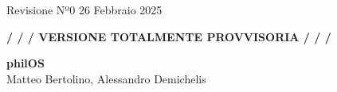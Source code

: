 \documentclass[a4paper,12pt]{article}
\begin{document}
\thispagestyle{empty} %
\footnotesize
Revisione Nº0
\hfill
26 Febbraio 2025
\normalsize 

\begin{center}
\textbf{ / / / VERSIONE TOTALMENTE PROVVISORIA / / /} 
\end{center}

\vspace*{\fill}
\begin{center}
\Large{\textbf{philOS}}
\vspace{0.1cm}
\normalsize
\\ Matteo Bertolino, Alessandro Demichelis \\
\vspace*{\fill}
\vspace{0.5cm}
\medskip
\normalsize
\end{center}

\pagebreak

\renewcommand{\contentsname}{Contenuti}
\tableofcontents
\bigskip

\pagebreak










\renewcommand{\refname}{Riferimenti}
\printbibliography
\bigskip
\end{document}
